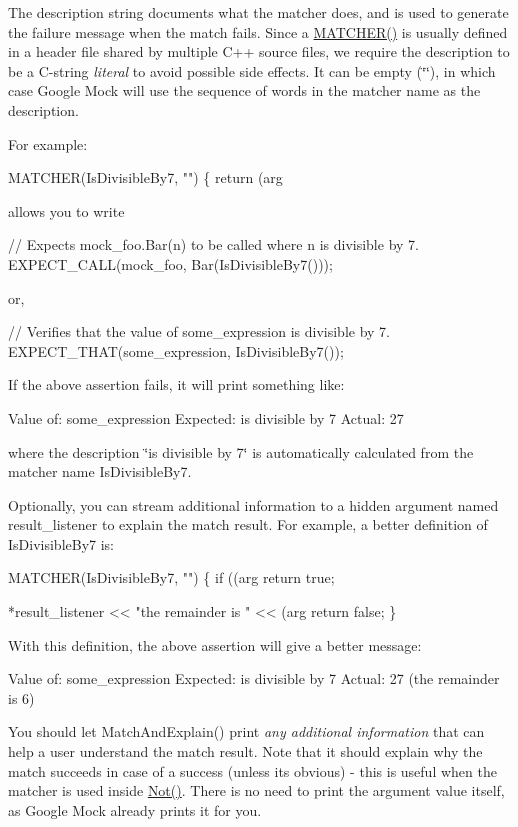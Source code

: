 The description string documents what the matcher does, and is used to generate the failure message when the match fails. Since a {\ttfamily \hyperlink{gmock-generated-matchers_8h_af4fe73ff8e2b0494f4970b575b65ddff}{M\+A\+T\+C\+H\+E\+R()}} is usually defined in a header file shared by multiple C++ source files, we require the description to be a C-\/string {\itshape literal} to avoid possible side effects. It can be empty ({\ttfamily \char`\"{}\char`\"{}}), in which case Google Mock will use the sequence of words in the matcher name as the description.

For example\+: 
\begin{DoxyCode}
MATCHER(IsDivisibleBy7, "") \{ return (arg %
\end{DoxyCode}
 allows you to write 
\begin{DoxyCode}
// Expects mock\_foo.Bar(n) to be called where n is divisible by 7.
EXPECT\_CALL(mock\_foo, Bar(IsDivisibleBy7()));
\end{DoxyCode}
 or, 
\begin{DoxyCode}
// Verifies that the value of some\_expression is divisible by 7.
EXPECT\_THAT(some\_expression, IsDivisibleBy7());
\end{DoxyCode}
 If the above assertion fails, it will print something like\+: 
\begin{DoxyCode}
Value of: some\_expression
Expected: is divisible by 7
  Actual: 27
\end{DoxyCode}
 where the description {\ttfamily \char`\"{}is divisible by 7\char`\"{}} is automatically calculated from the matcher name {\ttfamily Is\+Divisible\+By7}.

Optionally, you can stream additional information to a hidden argument named {\ttfamily result\+\_\+listener} to explain the match result. For example, a better definition of {\ttfamily Is\+Divisible\+By7} is\+: 
\begin{DoxyCode}
MATCHER(IsDivisibleBy7, "") \{
  if ((arg %
    return true;

  *result\_listener << "the remainder is " << (arg %
  return false;
\}
\end{DoxyCode}


With this definition, the above assertion will give a better message\+: 
\begin{DoxyCode}
Value of: some\_expression
Expected: is divisible by 7
  Actual: 27 (the remainder is 6)
\end{DoxyCode}


You should let {\ttfamily Match\+And\+Explain()} print {\itshape any additional information} that can help a user understand the match result. Note that it should explain why the match succeeds in case of a success (unless it\textquotesingle{}s obvious) -\/ this is useful when the matcher is used inside {\ttfamily \hyperlink{namespacetesting_a3d7d0dda7e51b13fe2f5aa28e23ed6b6}{Not()}}. There is no need to print the argument value itself, as Google Mock already prints it for you.

